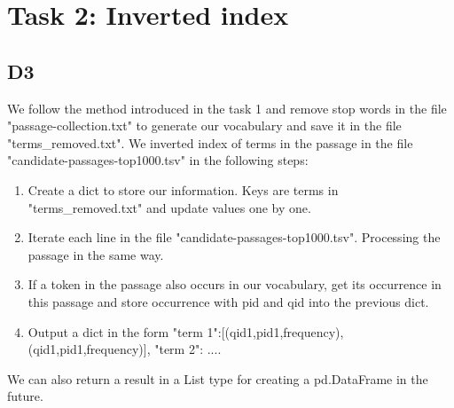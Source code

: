 \section{Task 2: Inverted index}
\subsection{D3}
We follow the method introduced in the task 1 and remove stop words in the file "passage-collection.txt" to generate our vocabulary and save it in the file "terms\_removed.txt". We inverted index of terms in the passage in the file "candidate-passages-top1000.tsv" in the following steps:
\begin{enumerate}
    \item Create a dict to store our information. Keys are terms in "terms\_removed.txt" and update values one by one.
    \item Iterate each line in the file "candidate-passages-top1000.tsv". Processing the passage in the same way.
    \item If a token in the passage also occurs in our vocabulary, get its occurrence in this passage and store occurrence with pid and qid into the previous dict.
    \item Output a dict in the form {"term 1":[(qid1,pid1,frequency), (qid1,pid1,frequency)], "term 2": ...}.
\end{enumerate}
We can also return a result in a List type for creating a pd.DataFrame in the future.